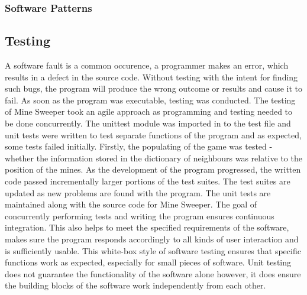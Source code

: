 \documentclass[12pt, a4]{report}
\begin{document}
	\subsubsection{Software Patterns}
	
	
	\subsection{Testing}
	\par A software fault is a common occurence, a programmer makes an error, which results in a defect in the source code. Without testing with the intent for finding such  bugs, the program will produce the wrong outcome or results and cause it to fail. As soon as the program was executable, testing was conducted. The testing of Mine Sweeper took an agile approach as programming and testing needed to be done concurrently. The unittest module was imported in to the test file and unit tests were written to test separate functions of the program and as expected, some tests failed initially. Firstly, the populating of the game was tested - whether the information stored in the dictionary of neighbours was relative to the position of the mines. As the development of the program progressed, the written code passed incrementally larger portions of the test suites. The test suites are updated as new problems are found with the program. The unit tests are maintained along with the source code for Mine Sweeper. The goal of concurrently performing tests and writing the program ensures continuous integration. This also helps to meet the specified requirements of the software, makes sure the program responds accordingly to all kinds of user interaction and is sufficiently usable. This white-box style of software testing ensures that specific functions work as expected, especially for small pieces of software. Unit testing does not guarantee the functionality of the software alone however, it does ensure the building blocks of the software work independently from each other.
	
	
	\newpage
\end{document}
